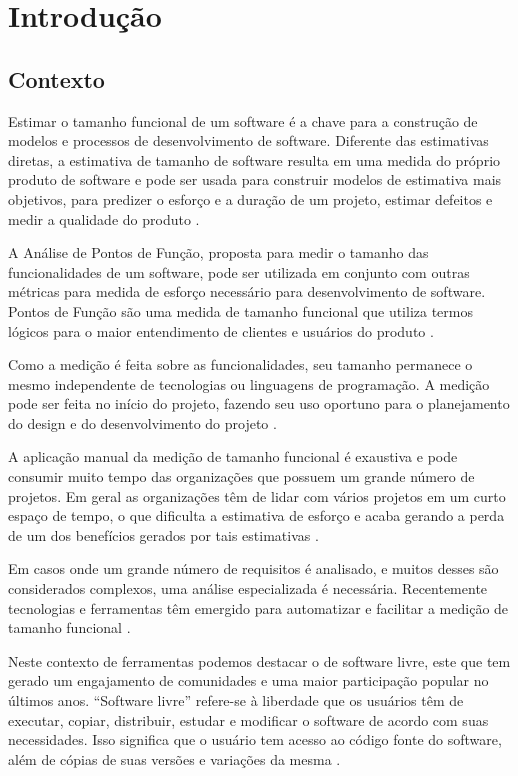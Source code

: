 \chapter[Introdução]{Introdução}

\section{Contexto}

Estimar o tamanho funcional de um software é a chave para a construção de modelos e processos de desenvolvimento de software. Diferente das estimativas diretas, a estimativa de tamanho de software resulta em uma medida do próprio produto de software e pode ser usada para construir modelos de estimativa mais objetivos, para predizer o esforço e a duração de um projeto, estimar defeitos e medir a qualidade do produto \cite{Ebert:2014}.

A Análise de Pontos de Função, proposta para medir o tamanho das funcionalidades de um software, pode ser utilizada em conjunto com outras métricas para medida de esforço necessário para desenvolvimento de software. Pontos de Função são uma medida de tamanho funcional que utiliza termos lógicos para o maior entendimento de clientes e usuários do produto \cite{Albrecht:1994}.

Como a medição é feita sobre as funcionalidades, seu tamanho permanece o mesmo independente de tecnologias ou linguagens de programação. A medição pode ser feita no início do projeto, fazendo seu uso oportuno para o planejamento do design e do desenvolvimento do projeto \cite{Kusumoto:2002}.

A aplicação manual da medição de tamanho funcional é exaustiva e pode consumir muito tempo das organizações que possuem um grande número de projetos. Em geral as organizações têm de lidar com vários projetos em um curto espaço de tempo, o que dificulta a estimativa de esforço e acaba gerando a perda de um dos benefícios gerados por tais estimativas \cite{Ebert:2014}.

Em casos onde um grande número de requisitos é analisado, e muitos desses são considerados complexos, uma análise especializada é necessária. Recentemente tecnologias e ferramentas têm emergido para automatizar e facilitar a medição de tamanho funcional \cite{Ebert:2014}.

Neste contexto de ferramentas podemos destacar o de software livre, este que tem gerado um engajamento de comunidades e uma maior participação popular no últimos anos. \cite{Eilola:2002} \nocite{Anota:2016} ``Software livre''  refere-se à liberdade que os usuários têm de executar, copiar, distribuir, estudar e modificar o software de acordo com suas necessidades. Isso significa que o usuário tem acesso ao código fonte do software, além de cópias de suas versões e variações da mesma \nocite{Stallman:2003}.

